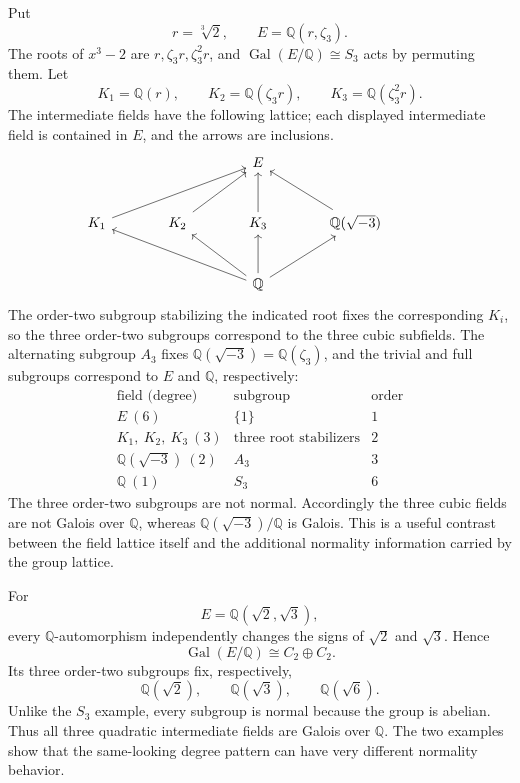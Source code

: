 \begin{example}
Put
\[
r=\sqrt[3]2,
\qquad
E=\mathbb Q(r,\zeta_3).
\]
The roots of \(x^3-2\) are \(r,\zeta_3r,\zeta_3^2r\), and
\(\operatorname{Gal}(E/\mathbb Q)\cong S_3\) acts by permuting them.  Let
\[
K_1=\mathbb Q(r),\qquad
K_2=\mathbb Q(\zeta_3r),\qquad
K_3=\mathbb Q(\zeta_3^2r).
\]
The intermediate fields have the following lattice; each displayed
intermediate field is contained in \(E\), and the arrows are inclusions.
\[
\begin{tikzcd}[column sep=large,row sep=large]
&& E &&\\
K_1 \arrow[urr] & K_2 \arrow[ur] & K_3 \arrow[u] &
\mathbb Q(\sqrt{-3}) \arrow[ul] \\
&& \mathbb Q \arrow[ull] \arrow[ul] \arrow[u] \arrow[ur] &&
\end{tikzcd}
\]
The order-two subgroup stabilizing the indicated root fixes the corresponding
\(K_i\), so the three order-two subgroups correspond to the three cubic
subfields.  The alternating subgroup \(A_3\) fixes
\(\mathbb Q(\sqrt{-3})=\mathbb Q(\zeta_3)\), and the trivial and full
subgroups correspond to \(E\) and \(\mathbb Q\), respectively:
\[
\begin{array}{c|c|c}
\text{field (degree)} & \text{subgroup} & \text{order}\\ \hline
E\ (6) & \{1\} & 1\\
K_1,\ K_2,\ K_3\ (3) & \text{three root stabilizers} & 2\\
\mathbb Q(\sqrt{-3})\ (2) & A_3 & 3\\
\mathbb Q\ (1) & S_3 & 6
\end{array}
\]
The three order-two subgroups are not normal.  Accordingly the three cubic
fields are not Galois over \(\mathbb Q\), whereas
\(\mathbb Q(\sqrt{-3})/\mathbb Q\) is Galois.  This is a useful contrast
between the field lattice itself and the additional normality information
carried by the group lattice.
\end{example}

\begin{example}
For
\[
E=\mathbb Q(\sqrt2,\sqrt3),
\]
every \(\mathbb Q\)-automorphism independently changes the signs of
\(\sqrt2\) and \(\sqrt3\).  Hence
\[
\operatorname{Gal}(E/\mathbb Q)\cong C_2\oplus C_2.
\]
Its three order-two subgroups fix, respectively,
\[
\mathbb Q(\sqrt2),\qquad
\mathbb Q(\sqrt3),\qquad
\mathbb Q(\sqrt6).
\]
Unlike the \(S_3\) example, every subgroup is normal because the group is
abelian.  Thus all three quadratic intermediate fields are Galois over
\(\mathbb Q\).  The two examples show that the same-looking degree pattern
can have very different normality behavior.
\end{example}

